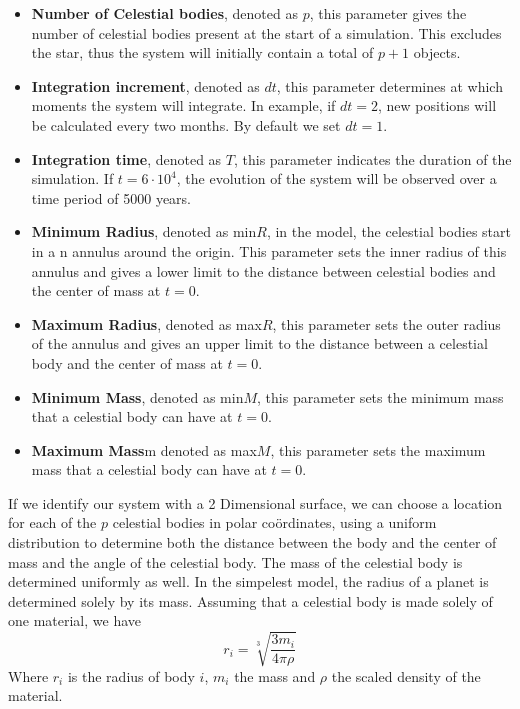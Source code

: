 \begin{itemize}
	\item \textbf{Number of Celestial bodies}, denoted as \(p\), this parameter gives the number of celestial bodies present at the start of a simulation. This excludes the star, thus the system will initially contain a total of \(p+1\) objects.
	\item \textbf{Integration increment}, denoted as \(dt\), this parameter determines at which moments the system will integrate. In example, if \(dt=2\), new positions will be calculated every two months. By default we set \(dt=1\).
	\item \textbf{Integration time}, denoted as \(T\), this parameter indicates the duration of the simulation. If \(t=6\cdot10^4\), the evolution of the system will be observed over a time period of 5000 years.
	\item \textbf{Minimum Radius}, denoted as min\(R\), in the model, the celestial bodies start in a n annulus around the origin. This parameter sets the inner radius of this annulus and gives a lower limit to the distance between celestial bodies and the center of mass at \(t=0\).
	\item \textbf{Maximum Radius}, denoted as max\(R\), this parameter sets the outer radius of the annulus and gives an upper limit to the distance between a celestial body and the center of mass at \(t=0\).
	\item \textbf{Minimum Mass}, denoted as min\(M\), this parameter sets the minimum mass that a celestial body can have at \(t=0\).
	\item \textbf{Maximum Mass}m denoted as max\(M\), this parameter sets the maximum mass that a celestial body can have at \(t=0\).
\end{itemize}
If we identify our system with a 2 Dimensional surface, we can choose a location for each of the \(p\) celestial bodies in polar co\"ordinates, using a uniform distribution to determine both the distance between the body and the center of mass and the angle of the celestial body. 
The mass of the celestial body is determined uniformly as well. In the simpelest model, the radius of a planet is determined solely by its mass. Assuming that a celestial body is made solely of one material, we have
\[r_i=\sqrt[3]{\frac{3 m_i}{4\pi \rho}}\]
Where \(r_i\) is the radius of body \(i\), \(m_i\) the mass and \(\rho\) the scaled density of the material.

